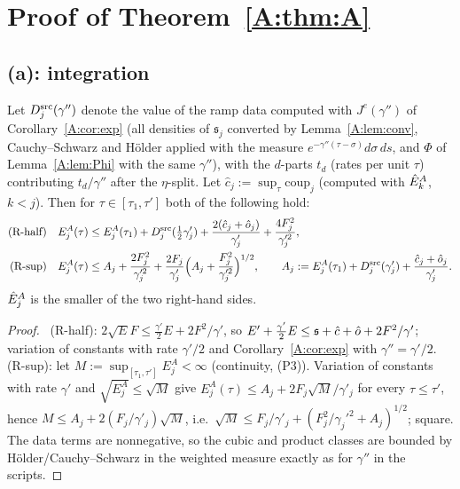 \documentclass[11pt]{article}
\begin{document}
\section{Proof of Theorem~\ref{A:thm:A}}\label{A:sec:int}
\subsection{(a): integration}
\begin{lemma}\label{A:lem:int}
Let $D^{\rm src}_j(\gamma'')$ denote the value of the ramp data computed with $J^e(\gamma'')$ of Corollary~\ref{A:cor:exp} (all densities of $\mathfrak s_j$ converted by Lemma~\ref{A:lem:conv}, Cauchy--Schwarz and H\"older applied with the measure $e^{-\gamma''(\tau-\sigma)}d\sigma\,ds$, and $\Phi$ of Lemma~\ref{A:lem:Phi} with the same $\gamma''$), with the $d$-parts $t_d$ (rates per unit $\tau$) contributing $t_d/\gamma''$ after the $\eta$-split. Let $\hat c_j:=\sup_\tau\mathrm{coup}_j$ (computed with $\hat E^A_k$, $k<j$). Then for $\tau\in[\tau_1,\tau']$ both of the following hold:
\begin{align*}
\text{(R-half)}\quad &E^A_j(\tau)\le E^A_j(\tau_1)+D^{\rm src}_j(\tfrac12\gamma'_j)+\frac{2(\hat c_j+\hat o_j)}{\gamma'_j}+\frac{4F_j^2}{\gamma_j'^2},\\
\text{(R-sup)}\quad &E^A_j(\tau)\le A_j+\frac{2F_j^2}{\gamma_j'^2}+\frac{2F_j}{\gamma'_j}\Bigl(A_j+\frac{F_j^2}{\gamma_j'^2}\Bigr)^{1/2},\qquad A_j:=E^A_j(\tau_1)+D^{\rm src}_j(\gamma'_j)+\frac{\hat c_j+\hat o_j}{\gamma'_j}.
\end{align*}
$\hat E^A_j$ is the smaller of the two right-hand sides.
\end{lemma}
\begin{proof}\tP\ (R-half): $2\sqrt EF\le\frac{\gamma'}2E+2F^2/\gamma'$, so $E'+\frac{\gamma'}2E\le\mathfrak s+\hat c+\hat o+2F^2/\gamma'$; variation of constants with rate $\gamma'/2$ and Corollary~\ref{A:cor:exp} with $\gamma''=\gamma'/2$. (R-sup): let $M:=\sup_{[\tau_1,\tau']}E^A_j<\infty$ (continuity, (P3)). Variation of constants with rate $\gamma'$ and $\sqrt{E^A_j}\le\sqrt M$ give $E^A_j(\tau)\le A_j+2F_j\sqrt M/\gamma'_j$ for every $\tau\le\tau'$, hence $M\le A_j+2(F_j/\gamma'_j)\sqrt M$, i.e.\ $\sqrt M\le F_j/\gamma'_j+(F_j^2/\gamma_j'^2+A_j)^{1/2}$; square. The data terms are nonnegative, so the cubic and product classes are bounded by H\"older/Cauchy--Schwarz in the weighted measure exactly as for $\gamma''$ in the scripts.
\end{proof}
\end{document}
